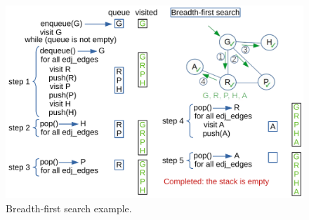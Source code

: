 \begin{figure}[H]
	\begin{center}
		\includegraphics[scale=.6]{chapters/appendix/images/appendixgraphs/graphsappendix_2.pdf}
		\caption[Breadth-first search example.]{Breadth-first search example.}
		\label{graphappendix_2}
	\end{center}
\end{figure}

